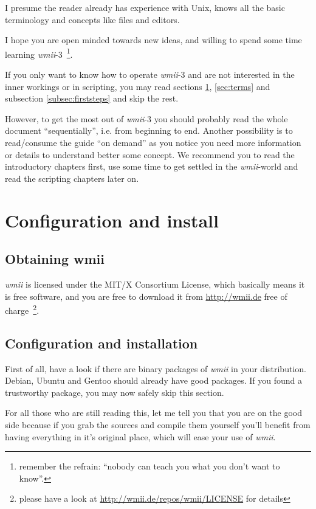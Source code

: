 \documentclass[12pt,a4paper]{article} %
\newcommand{\hrefx}[1]{\href{#1}{#1}} %
\newcommand{\wmii}{\emph{wmii}}
\begin{document}
    I presume the reader already has experience with Unix, knows all
    the basic terminology and concepts like files and editors.

    I hope you are open minded towards new ideas, and willing to spend some
    time learning \wmii-3~\footnote{remember the refrain: ``nobody
    can teach you what you don't want to know''.}.

    If you only want to know how to operate \wmii-3 and are not
    interested in the inner workings or in scripting, you may read
    sections \ref{sec:conf&install}, \ref{sec:terms} and subsection
    \ref{subsec:firststeps} and skip the rest.

    However, to get the most out of \wmii-3 you should probably read
    the whole document ``sequentially'', i.e. from beginning to end.
    Another possibility is to read/consume the guide ``on demand'' as
    you notice you need more information or details to understand
    better some concept. We recommend you to read the introductory
    chapters first, use some time to get settled in the \wmii-world
    and read the scripting chapters later on.
    
    \section{Configuration and install}
    \label{sec:conf&install}

    \subsection{Obtaining wmii}

    \wmii{} is licensed under the MIT/X Consortium License, which
    basically means it is free software, and you are free to download
    it from \hrefx{http://wmii.de} free of charge~\footnote{ please have
      a look at \hrefx{http://wmii.de/repos/wmii/LICENSE}  for
      details}.
    
    \subsection{Configuration and installation}
    
    First of all, have a look if there are binary packages of \wmii{} in
    your distribution. Debian, Ubuntu and Gentoo should already have
    good packages. If you found a trustworthy package, you may now safely
    skip this section.

    For all those who are still reading this, let me tell you that you are
    on the good side because if you grab the sources and compile them yourself
    you'll benefit from having everything in it's original place, which will
    ease your use of \wmii.
    
\end{document}
